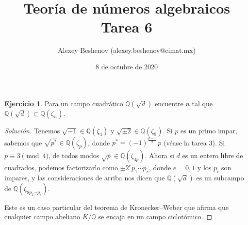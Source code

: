 \documentclass{article}
\title{Teoría de números algebraicos\\Tarea 6}
\author{Alexey Beshenov (alexey.beshenov@cimat.mx)}
\date{8 de octubre de 2020}
\newcounter{tarea}
\theoremstyle{definition}
\newtheorem{ejercicio}{Ejercicio}[tarea]
\newenvironment{solucion}{\begin{proof}[Solución]}{\end{proof}}
\newcommand{\QQ}{\mathbb{Q}}
\begin{document}
{\sffamily\bfseries\maketitle}

\ifdefined\solutions
\else
\thispagestyle{empty}
\fi

\vspace{1em}

\begin{ejercicio}
  Para un campo cuadrático $\QQ (\sqrt{d})$ encuentre $n$ tal que
  $\QQ (\sqrt{d}) \subset \QQ (\zeta_n)$.

  \ifdefined\solutions
  \begin{solucion}
    Tenemos $\sqrt{-1} \in \QQ (\zeta_4)$ y $\sqrt{\pm 2} \in \QQ (\zeta_8)$.
    Si $p$ es un primo impar, sabemos que $\sqrt{p^*} \in \QQ (\zeta_p)$, donde
    $p^* = (-1)^{\frac{p-1}{2}}\,p$ (véase la tarea 3). Si $p \equiv 3\pmod{4}$,
    de todos modos $\sqrt{p} \in \QQ (\zeta_{4p})$. Ahora si $d$ es un entero
    libre de cuadrados, podemos factorizarlo como $\pm 2^e p_1 \cdots p_s$,
    donde $e = 0, 1$ y los $p_i$ son impares, y las consideraciones de arriba
    nos dicen que $\QQ (\sqrt{d})$ es un subcampo de
    $\QQ (\zeta_{8 p_1\cdots p_s})$.

    Este es un caso particular del teorema de Kronecker--Weber que afirma que
    cualquier campo abeliano $K/\QQ$ se encaja en un campo ciclotómico.
  \end{solucion}
  \fi
\end{ejercicio}
\end{document}
